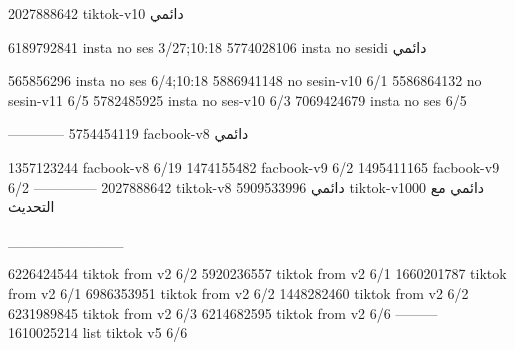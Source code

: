 2027888642 tiktok-v10
دائمي

6189792841 insta no ses
3/27;10:18
5774028106 insta no sesidi
دائمي

565856296 insta no ses
6/4;10:18
5886941148 no sesin-v10
6/1
5586864132 no sesin-v11
6/5
5782485925 insta no ses-v10
6/3
7069424679 insta no ses
6/5

------------
5754454119 facbook-v8
دائمي

1357123244 facbook-v8
6/19
1474155482 facbook-v9
6/2
1495411165 facbook-v9
6/2
--------------
2027888642 tiktok-v8
دائمي
5909533996 tiktok-v1000
دائمي مع التحديث

___________

6226424544 tiktok from v2
6/2
5920236557 tiktok from v2
6/1
1660201787 tiktok from v2
6/1
6986353951 tiktok from v2
6/2
1448282460 tiktok from v2
6/2
6231989845 tiktok from v2
6/3
6214682595 tiktok from v2
6/6
---------
1610025214 list tiktok v5
6/6

